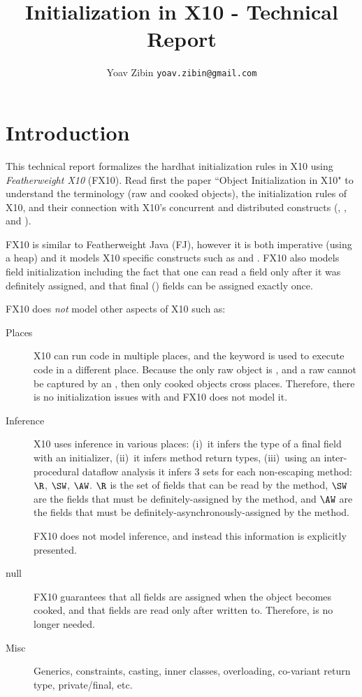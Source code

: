 \documentclass[9pt,a4paper]{article}
\title{Initialization in X10 - Technical Report}
\author{Yoav Zibin \texttt{yoav.zibin@gmail.com}}
\date{}
\begin{document}
\maketitle


\lstset{language=java,basicstyle=\ttfamily\small}

\section{Introduction}
This technical report formalizes the hardhat initialization rules in X10
    using \emph{Featherweight X10} (FX10).
Read first the paper ``Object Initialization in X10" to understand
    the terminology (raw and cooked objects),
    the initialization rules of X10,
    and their connection with X10's concurrent and distributed constructs (\finish, \async, and ).

FX10 is similar to Featherweight Java (FJ), however it is both imperative (using a heap) and it
    models X10 specific constructs such as \finish and \async.
FX10 also models field initialization including the fact that one can read a field only after it was definitely assigned,
    and that final () fields can be assigned exactly once.

FX10 does \emph{not} model other aspects of X10 such as:
\begin{description}
  \item[Places] X10 can run code in multiple places, and the  keyword is used to execute code in a different place.
    Because the only raw object is \this,
        and a raw \this cannot be captured by an ,
        then only cooked objects cross places.
    Therefore, there is no initialization issues with  and FX10 does not model it.
  \item[Inference]
    X10 uses inference in various places:
        (i)~it infers the type of a final field with an initializer,
        (ii)~it infers method return types,
        (iii)~using an inter-procedural dataflow analysis it infers
            3 sets for each non-escaping method: $\R$, $\SW$, $\AW$.
            $\R$ is the set of fields that can be read by the method,
                $\SW$ are the fields that must be definitely-assigned by the method,
                and $\AW$ are the fields that must be definitely-asynchronously-assigned by the method.

    FX10 does not model inference, and instead this information is explicitly presented.
  \item[null]
    FX10 guarantees that all fields are assigned when the object becomes cooked,
        and that fields are read only after written to.
    Therefore, \hnull is no longer needed.

  \item[Misc]
    Generics, constraints, casting, inner classes, overloading, co-variant return type, private/final, etc.
\end{description}
\end{document}
